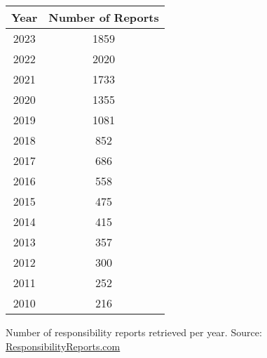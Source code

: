 \documentclass[12pt]{article}
\begin{document}
\begin{table}[ht]

    \label{tab:sust_reps}
    \centering

    \begin{tabular}{cc}
        \toprule
        Year & Number of Reports\\
        \midrule
        2023 & 1859\\
        2022 & 2020\\
        2021 & 1733\\
        2020 & 1355\\
        2019 & 1081\\
        2018 & 852\\
        2017 & 686\\
        2016 & 558\\
        2015 & 475\\
        2014 & 415\\
        2013 & 357\\
        2012 & 300\\
        2011 & 252\\
        2010 & 216\\
        \bottomrule
    \end{tabular}

    \vspace{0.2cm}

    \begin{tablenotes}
        \footnotesize
        \item Number of responsibility reports retrieved per year. Source: \href{https://responsibilityreports.com}{ResponsibilityReports.com}
    \end{tablenotes}

\end{table}

\newpage
\end{document}

